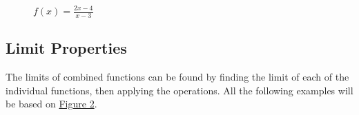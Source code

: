 \documentclass[12pt]{article}
\begin{document}
\begin{figure}[H]
	\begin{center}
		\caption{$f(x) = \frac{2x-4}{x-3}$}
		\label{fig:limasymptote}
	\end{center}
\end{figure}

\subsection{Limit Properties}
The limits of combined functions can be found by finding the limit of each of the individual functions, then applying the operations. All the following examples will be based on \hyperref[fig:limasymptote]{Figure 2}.
\end{document}
